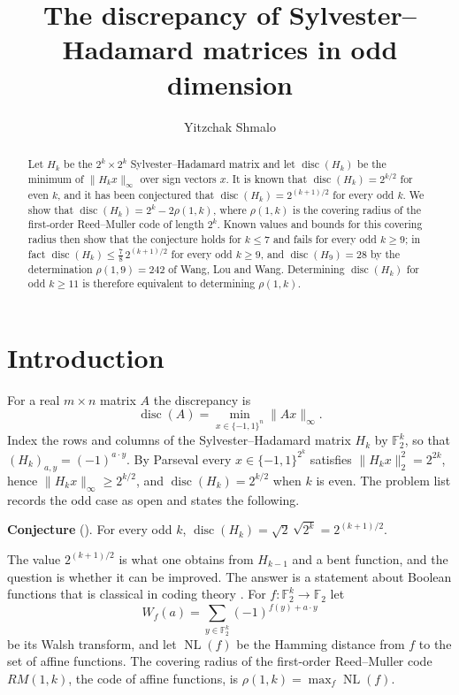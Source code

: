 \documentclass[11pt]{amsart}
\title{The discrepancy of Sylvester--Hadamard matrices in odd dimension}
\author{Yitzchak Shmalo}
\date{}
\theoremstyle{remark}
\newcommand{\F}{\mathbb{F}_2}
\newcommand{\disc}{\operatorname{disc}}
\newcommand{\NL}{\operatorname{NL}}
\begin{document}
\begin{abstract}
Let $H_k$ be the $2^k\times 2^k$ Sylvester--Hadamard matrix and let
$\disc(H_k)$ be the minimum of $\|H_kx\|_\infty$ over sign vectors $x$. It is known that
$\disc(H_k)=2^{k/2}$ for even $k$, and it has been conjectured that
$\disc(H_k)=2^{(k+1)/2}$ for every odd $k$. We show that
$\disc(H_k)=2^k-2\rho(1,k)$, where $\rho(1,k)$ is the covering radius of the
first-order Reed--Muller code of length $2^k$. Known values and bounds for this
covering radius then show that the conjecture holds for $k\le 7$ and fails for
every odd $k\ge 9$; in fact $\disc(H_k)\le \tfrac78\,2^{(k+1)/2}$ for every odd
$k\ge 9$, and $\disc(H_9)=28$ by the determination $\rho(1,9)=242$ of Wang, Lou
and Wang. Determining $\disc(H_k)$ for odd $k\ge 11$ is therefore equivalent to
determining $\rho(1,k)$.
\end{abstract}

\maketitle

\section{Introduction}

For a real $m\times n$ matrix $A$ the discrepancy is
\[
\disc(A)=\min_{x\in\{-1,1\}^n}\|Ax\|_\infty .
\]
Index the rows and columns of the Sylvester--Hadamard matrix $H_k$ by $\F^k$,
so that $(H_k)_{a,y}=(-1)^{a\cdot y}$. By Parseval every $x\in\{-1,1\}^{2^k}$
satisfies $\|H_kx\|_2^2=2^{2k}$, hence $\|H_kx\|_\infty\ge 2^{k/2}$, and
$\disc(H_k)=2^{k/2}$ when $k$ is even. The problem list \cite{RS101} records the
odd case as open and states the following.

\medskip
\noindent\textbf{Conjecture} (\cite[Conjecture 13]{RS101}).
For every odd $k$, $\disc(H_k)=\sqrt2\,\sqrt{2^k}=2^{(k+1)/2}$.
\medskip

The value $2^{(k+1)/2}$ is what one obtains from $H_{k-1}$ and a bent function,
and the question is whether it can be improved. The answer is a statement about
Boolean functions that is classical in coding theory \cite{CHLL,Carlet}. For $f\colon\F^k\to\F$ let
\[
W_f(a)=\sum_{y\in\F^k}(-1)^{f(y)+a\cdot y}
\]
be its Walsh transform, and let $\NL(f)$ be the Hamming distance from $f$ to the
set of affine functions. The covering radius of the first-order Reed--Muller code
$RM(1,k)$, the code of affine functions, is $\rho(1,k)=\max_f\NL(f)$.
\end{document}

